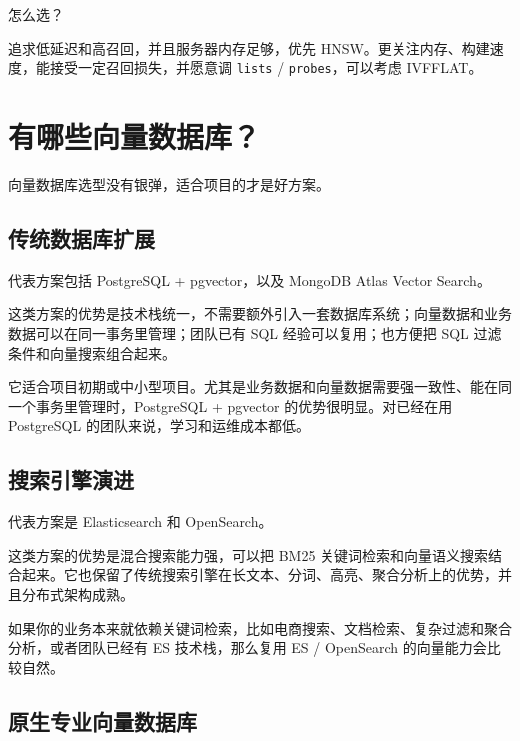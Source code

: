 \documentclass[10pt,a4paper]{ctexart}
\begin{document}
怎么选？



追求低延迟和高召回，并且服务器内存足够，优先 HNSW。更关注内存、构建速度，能接受一定召回损失，并愿意调 \texttt{lists} / \texttt{probes}，可以考虑 IVFFLAT。



\section{有哪些向量数据库？}


向量数据库选型没有银弹，适合项目的才是好方案。



\subsection{传统数据库扩展}


代表方案包括 PostgreSQL + pgvector，以及 MongoDB Atlas Vector Search。



这类方案的优势是技术栈统一，不需要额外引入一套数据库系统；向量数据和业务数据可以在同一事务里管理；团队已有 SQL 经验可以复用；也方便把 SQL 过滤条件和向量搜索组合起来。



它适合项目初期或中小型项目。尤其是业务数据和向量数据需要强一致性、能在同一个事务里管理时，PostgreSQL + pgvector 的优势很明显。对已经在用 PostgreSQL 的团队来说，学习和运维成本都低。



\subsection{搜索引擎演进}


代表方案是 Elasticsearch 和 OpenSearch。



这类方案的优势是混合搜索能力强，可以把 BM25 关键词检索和向量语义搜索结合起来。它也保留了传统搜索引擎在长文本、分词、高亮、聚合分析上的优势，并且分布式架构成熟。



如果你的业务本来就依赖关键词检索，比如电商搜索、文档检索、复杂过滤和聚合分析，或者团队已经有 ES 技术栈，那么复用 ES / OpenSearch 的向量能力会比较自然。



\subsection{原生专业向量数据库}
\end{document}
